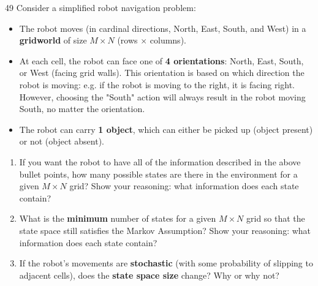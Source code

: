 \documentclass[11pt]{article}
\begin{document}
\begin{studentanswer}[30]
\end{studentanswer}


\begin{problem}{4}{9}
Consider a simplified robot navigation problem:

\begin{itemize}
    \item The robot moves (in cardinal directions, North, East, South, and West) in a \textbf{gridworld} of size $M \times N$ (rows $\times$ columns).  
    \item At each cell, the robot can face one of \textbf{4 orientations}: North, East, South, or West (facing grid walls). This orientation is based on which direction the robot is moving: e.g. if the robot is moving to the right, it is facing right. However, choosing the "South" action will always result in the robot moving South, no matter the orientation.
    \item The robot can carry \textbf{1 object}, which can either be picked up (object present) or not (object absent).  
\end{itemize}

\begin{enumerate}[label=(\alph*)]
    \item If you want the robot to have all of the information described in the above bullet points, how many possible states are there in the environment for a given $M \times N$ grid?  
    Show your reasoning: what information does each state contain? 
    \item What is the \textbf{minimum} number of states for a given $M \times N$ grid so that the state space still satisfies the Markov Assumption? Show your reasoning: what information does each state contain?
    \item If the robot’s movements are \textbf{stochastic} (with some probability of slipping to adjacent cells), does the \textbf{state space size} change? Why or why not?
\end{enumerate}

\end{problem}

\begin{studentanswer}[30]
\end{studentanswer}
\end{document}
